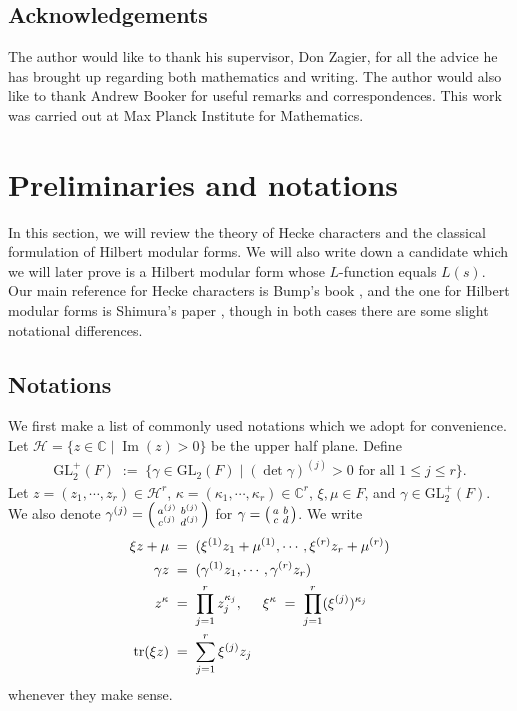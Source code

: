 \documentclass[11pt]{amsart}
\theoremstyle{remark}
\newcommand\sm[1]{\begin{psmallmatrix}#1\end{psmallmatrix}}
\newcommand{\comp}{\mathbb{C}}
\newcommand{\clh}{\mathcal{H}}
\newcommand{\eq}{\;=\;}
\newcommand{\deq}{\;:=\;}
\newcommand{\GL}{\mathrm{GL}}
\newcommand{\tr}{\mathrm{tr}}
\renewcommand{\Im}{\operatorname{Im}}
\begin{document}
\subsection{Acknowledgements}
The author would like to thank his supervisor, Don Zagier, for all the advice he has brought up regarding both mathematics and writing. The author would also like to thank Andrew Booker for useful remarks and correspondences. This work was carried out at Max Planck Institute for Mathematics.


\section{Preliminaries and notations}
\label{prelims}
In this section, we will review the theory of Hecke characters and the classical formulation of Hilbert modular forms. We will also write down a candidate which we will later prove is a Hilbert modular form whose $L$-function equals $L(s)$. Our main reference for Hecke characters is Bump's book \cite{bump}, and the one for Hilbert modular forms is Shimura's paper \cite{shimurahmf}, though in both cases there are some slight notational differences.

\subsection{Notations}

We first make a list of commonly used notations which we adopt for convenience. Let $\clh=\{z\in\comp\mid\Im(z)>0\}$ be the upper half plane. Define
\begin{align*}
    \GL_2^+(F)\deq\{\gamma\in\GL_2(F)\mid(\det\gamma)^{(j)}>0\text{ for all }1\leq j\leq r\}.
\end{align*}
Let $z=(z_1,\cdots,z_r)\in\clh^r$, $\kappa=(\kappa_1,\cdots,\kappa_r)\in\comp^r$, $\xi,\mu\in F$, and $\gamma\in\GL_2^+(F)$. We also denote $\gamma^{(j)}=\sm{a^{(j)}&b^{(j)}\\c^{(j)}&d^{(j)}}$ for $\gamma=\sm{a&b\\c&d}$.
We write
\begin{align*}
    \xi z+\mu&\eq(\xi^{(1)}z_1+\mu^{(1)},\cdots,\xi^{(r)}z_r+\mu^{(r)}) \\
    \gamma z&\eq(\gamma^{(1)}z_1,\cdots,\gamma^{(r)}z_r) \\
    z^\kappa&\eq\prod_{j=1}^rz_j^{\kappa_j},\hspace{0.5cm}\xi^\kappa\eq\prod_{j=1}^r(\xi^{(j)})^{\kappa_j} \\
    \tr(\xi z)&\eq\sum_{j=1}^r \xi^{(j)}z_j
\end{align*}
whenever they make sense.
\end{document}
